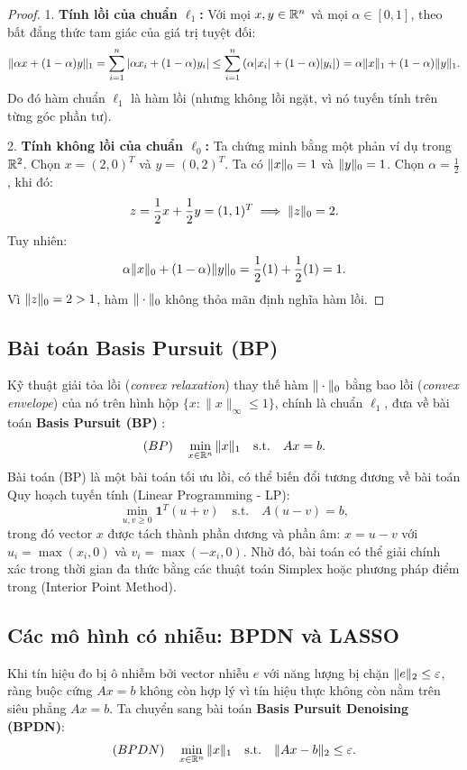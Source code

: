 \begin{proof}
1. \textbf{Tính lồi của chuẩn $\ell_1$:} Với mọi $x, y \in \mathbb{R}^n$ và mọi $\alpha \in [0, 1]$, theo bất đẳng thức tam giác của giá trị tuyệt đối:
\[
\|\alpha x + (1 - \alpha) y\|_1 = \sum_{i=1}^n |\alpha x_i + (1 - \alpha) y_i| \le \sum_{i=1}^n \left( \alpha |x_i| + (1 - \alpha) |y_i| \right) = \alpha \|x\|_1 + (1 - \alpha) \|y\|_1.
\]
Do đó hàm chuẩn $\ell_1$ là hàm lồi (nhưng không lồi ngặt, vì nó tuyến tính trên từng góc phần tư).

2. \textbf{Tính không lồi của chuẩn $\ell_0$:} Ta chứng minh bằng một phản ví dụ trong $\mathbb{R}^2$. Chọn $x = (2, 0)^T$ và $y = (0, 2)^T$. Ta có $\|x\|_0 = 1$ và $\|y\|_0 = 1$. Chọn $\alpha = \frac{1}{2}$, khi đó:
\[
z = \frac{1}{2}x + \frac{1}{2}y = (1, 1)^T \implies \|z\|_0 = 2.
\]
Tuy nhiên:
\[
\alpha \|x\|_0 + (1 - \alpha) \|y\|_0 = \frac{1}{2}(1) + \frac{1}{2}(1) = 1.
\]
Vì $\|z\|_0 = 2 > 1$, hàm $\|\cdot\|_0$ không thỏa mãn định nghĩa hàm lồi.
\end{proof}

\subsection{Bài toán Basis Pursuit (BP)}
Kỹ thuật giải tỏa lồi (\emph{convex relaxation}) thay thế hàm $\|\cdot\|_0$ bằng bao lồi (\emph{convex envelope}) của nó trên hình hộp $\{x : \|x\|_\infty \le 1\}$, chính là chuẩn $\ell_1$, đưa về bài toán \textbf{Basis Pursuit (BP)} \cite{donoho2006compressed, foucart2013mathematical}:
\begin{equation}
    (BP) \quad \min_{x \in \mathbb{R}^n} \|x\|_1 \quad \text{s.t.} \quad Ax = b.
\end{equation}
Bài toán (BP) là một bài toán tối ưu lồi, có thể biến đổi tương đương về bài toán Quy hoạch tuyến tính (Linear Programming - LP):
\begin{equation}
    \min_{u, v \ge 0} \mathbf{1}^T(u + v) \quad \text{s.t.} \quad A(u - v) = b,
\end{equation}
trong đó vector $x$ được tách thành phần dương và phần âm: $x = u - v$ với $u_i = \max(x_i, 0)$ và $v_i = \max(-x_i, 0)$. Nhờ đó, bài toán có thể giải chính xác trong thời gian đa thức bằng các thuật toán Simplex hoặc phương pháp điểm trong (Interior Point Method).

\subsection{Các mô hình có nhiễu: BPDN và LASSO}
Khi tín hiệu đo bị ô nhiễm bởi vector nhiễu $e$ với năng lượng bị chặn $\|e\|_2 \le \varepsilon$, ràng buộc cứng $Ax = b$ không còn hợp lý vì tín hiệu thực không còn nằm trên siêu phẳng $Ax = b$. Ta chuyển sang bài toán \textbf{Basis Pursuit Denoising (BPDN)}:
\begin{equation}
    (BPDN) \quad \min_{x \in \mathbb{R}^n} \|x\|_1 \quad \text{s.t.} \quad \|Ax - b\|_2 \le \varepsilon.
\end{equation}

